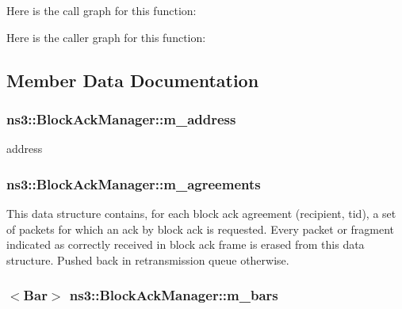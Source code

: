 Here is the call graph for this function\+:




Here is the caller graph for this function\+:




\subsection{Member Data Documentation}
\subsubsection[{\texorpdfstring{m\+\_\+address}{m_address}}]{ ns3\+::\+Block\+Ack\+Manager\+::m\+\_\+address\hspace{0.3cm}{\ttfamily [private]}}\hypertarget{classns3_1_1BlockAckManager_af22b7c479eb2dbd8e1e7a360e807d889}{}\label{classns3_1_1BlockAckManager_af22b7c479eb2dbd8e1e7a360e807d889}


address 

\subsubsection[{\texorpdfstring{m\+\_\+agreements}{m_agreements}}]{ ns3\+::\+Block\+Ack\+Manager\+::m\+\_\+agreements\hspace{0.3cm}{\ttfamily [private]}}\hypertarget{classns3_1_1BlockAckManager_a952a6b8b29705c83ba6464f7cf7ffe66}{}\label{classns3_1_1BlockAckManager_a952a6b8b29705c83ba6464f7cf7ffe66}
This data structure contains, for each block ack agreement (recipient, tid), a set of packets for which an ack by block ack is requested. Every packet or fragment indicated as correctly received in block ack frame is erased from this data structure. Pushed back in retransmission queue otherwise. 
\subsubsection[{\texorpdfstring{m\+\_\+bars}{m_bars}}]{$<${\bf Bar}$>$ ns3\+::\+Block\+Ack\+Manager\+::m\+\_\+bars\hspace{0.3cm}{\ttfamily [private]}}\hypertarget{classns3_1_1BlockAckManager_af2339008509896569fe53c035f27c9b4}{}\label{classns3_1_1BlockAckManager_af2339008509896569fe53c035f27c9b4}


